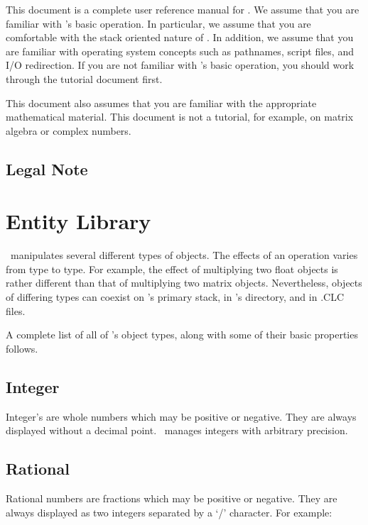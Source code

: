 \documentclass{report}
\begin{document}
This document is a complete user reference manual for \CLAC. We assume that you are familiar
with \CLAC's basic operation. In particular, we assume that you are comfortable with the stack
oriented nature of \CLAC. In addition, we assume that you are familiar with operating system
concepts such as pathnames, script files, and I/O redirection. If you are not familiar with
\CLAC's basic operation, you should work through the tutorial document first.

This document also assumes that you are familiar with the appropriate mathematical material.
This document is not a tutorial, for example, on matrix algebra or complex numbers.

\section{Legal Note}

%
%

\chapter{Entity Library}

\CLAC\ manipulates several different types of objects. The effects of an operation varies from
type to type. For example, the effect of multiplying two float objects is rather different than
that of multiplying two matrix objects. Nevertheless, objects of differing types can coexist on
\CLAC's primary stack, in \CLAC's directory, and in .CLC files.

A complete list of all of \CLAC's object types, along with some of their basic properties
follows.

\section{Integer}

Integer's are whole numbers which may be positive or negative. They are always displayed without
a decimal point. \CLAC\ manages integers with arbitrary precision.

\section{Rational}

Rational numbers are fractions which may be positive or negative. They are always displayed as
two integers separated by a `/' character. For example:
\end{document}
